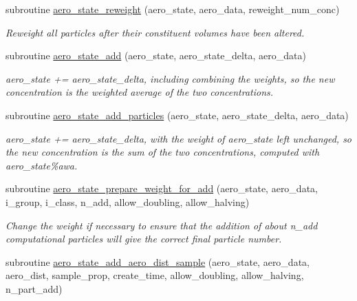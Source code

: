 \begin{DoxyCompactItemize}
subroutine \mbox{\hyperlink{namespacepmc__aero__state_a38c69c82e0dbc601557ff505d0513ba6}{aero\+\_\+state\+\_\+reweight}} (aero\+\_\+state, aero\+\_\+data, reweight\+\_\+num\+\_\+conc)
\begin{DoxyCompactList}\small\item\em Reweight all particles after their constituent volumes have been altered. \end{DoxyCompactList}\item 
subroutine \mbox{\hyperlink{namespacepmc__aero__state_ad9c12bba90caa58b86882ebfe4a4335c}{aero\+\_\+state\+\_\+add}} (aero\+\_\+state, aero\+\_\+state\+\_\+delta, aero\+\_\+data)
\begin{DoxyCompactList}\small\item\em {\ttfamily aero\+\_\+state += aero\+\_\+state\+\_\+delta}, including combining the weights, so the new concentration is the weighted average of the two concentrations. \end{DoxyCompactList}\item 
subroutine \mbox{\hyperlink{namespacepmc__aero__state_a9960460ba28e89f4f253dcbdb482fff7}{aero\+\_\+state\+\_\+add\+\_\+particles}} (aero\+\_\+state, aero\+\_\+state\+\_\+delta, aero\+\_\+data)
\begin{DoxyCompactList}\small\item\em {\ttfamily aero\+\_\+state += aero\+\_\+state\+\_\+delta}, with the weight of {\ttfamily aero\+\_\+state} left unchanged, so the new concentration is the sum of the two concentrations, computed with {\ttfamily aero\+\_\+state\%awa}. \end{DoxyCompactList}\item 
subroutine \mbox{\hyperlink{namespacepmc__aero__state_af3652445ddd2485a544cc426b3248481}{aero\+\_\+state\+\_\+prepare\+\_\+weight\+\_\+for\+\_\+add}} (aero\+\_\+state, aero\+\_\+data, i\+\_\+group, i\+\_\+class, n\+\_\+add, allow\+\_\+doubling, allow\+\_\+halving)
\begin{DoxyCompactList}\small\item\em Change the weight if necessary to ensure that the addition of about {\ttfamily n\+\_\+add} computational particles will give the correct final particle number. \end{DoxyCompactList}\item 
subroutine \mbox{\hyperlink{namespacepmc__aero__state_a28368fd18fc170709b6809de1930037d}{aero\+\_\+state\+\_\+add\+\_\+aero\+\_\+dist\+\_\+sample}} (aero\+\_\+state, aero\+\_\+data, aero\+\_\+dist, sample\+\_\+prop, create\+\_\+time, allow\+\_\+doubling, allow\+\_\+halving, n\+\_\+part\+\_\+add)

\end{DoxyCompactItemize}
